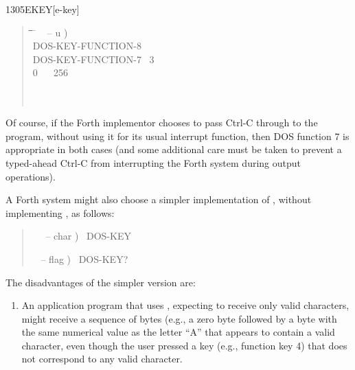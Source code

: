 \begin{worddef}{1305}{EKEY}[e-key]
\begin{defer}
		\begin{quote}
			\ttfamily
			\begin{tabbing}
			\tab \= \tab \= \tab \= \tab \= \hspace{7em} \= \kill
			\+ \word{:} ~  -- u ) \\
				\+ DOS-KEY-FUNCTION-8~ ~ ~  \\
					DOS-KEY-FUNCTION-7~  3~ \word{=}~  \\
					\>  0~ ~ 256 \word{+}\\
				\- \word{THEN} \\
			\-  \\
			\word{;}
			\end{tabbing}
		\end{quote}

		Of course, if the Forth implementor chooses to pass Ctrl-C
		through to the program, without using it for its usual
		interrupt function, then DOS function 7 is appropriate in both
		cases (and some additional care must be taken to prevent a
		typed-ahead Ctrl-C from interrupting the Forth system during
		output operations).

		A Forth system might also choose a simpler implementation of
		, without implementing , as follows:

		\begin{quote}\ttfamily
			\word{:} ~~  -- char )~
				DOS-KEY~
			\word{;}

			\word{:} ~  -- flag )~
				DOS-KEY?~ ~
			\word{;}
		\end{quote}

		The disadvantages of the simpler version are:

		\begin{enumerate}
		\item An application program that uses ,
			expecting to receive only valid characters, might receive a
			sequence of bytes (e.g., a zero byte followed by a byte with
			the same numerical value as the letter ``A'' that appears to
			contain a valid character, even though the user pressed a key
			(e.g., function key 4) that does not correspond to any valid
			character.


\end{enumerate}
\end{defer}
\end{worddef}
